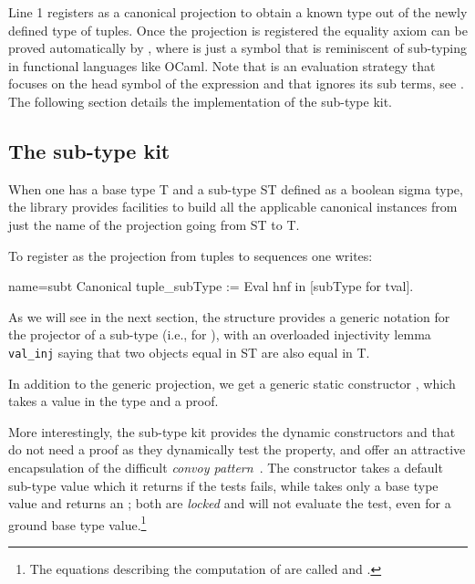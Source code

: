 Line 1 registers  as a canonical projection to obtain a known
type out of the newly defined type of tuples.  Once the projection
is registered the equality axiom can be proved automatically by
, where \C{<:} is just a symbol
that is reminiscent of sub-typing in functional languages like OCaml.
Note that  is an evaluation strategy that focuses on the head
symbol of the expression and that ignores its sub terms, see \cite[section
5.3.7, ``Performing computations'']{Coq:manual}.
The following section details the implementation of the sub-type kit.


\subsection{The sub-type kit}

\warntechnical{}

When one has a base type T and a sub-type ST defined as a boolean
sigma type, the \mcbMC{} library provides facilities to
build all the applicable canonical instances from just
the name of the projection going from ST to T.

To register  as the projection from tuples to sequences one
writes:

\begin{coq}{name=subt}{}
Canonical tuple_subType := Eval hnf in [subType for tval].
\end{coq}

As we will see in the next section, the  structure provides
a generic notation  for the projector of a sub-type (i.e.,
 for ), with an overloaded injectivity lemma
\lstinline/val_inj/ saying that two objects equal in ST are also equal
in T.

In addition to the generic projection, we get a generic static
constructor , which takes a value in the type  and a proof.

More interestingly, the sub-type kit provides the dynamic constructors
 and  that do not need a proof as they dynamically
test the property, and offer
an attractive encapsulation of the difficult \emph{convoy
pattern}~\cite[section 8.4]{CPDT}.
The  constructor takes a default
sub-type value which it returns if the tests fails, while 
takes only a base type value and returns an ; both are
\emph{locked} and will not evaluate the test, even for a ground base
type value.\footnote{The equations describing the computation
of  are called  and .}


